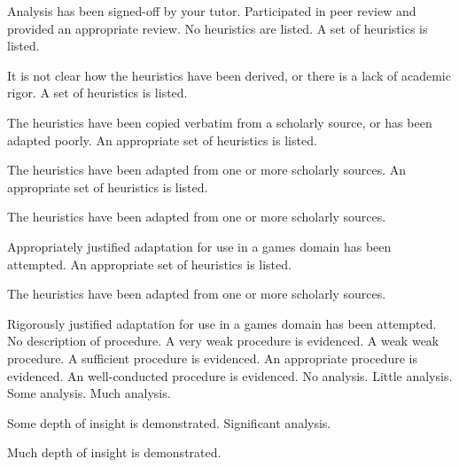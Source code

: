 \documentclass{../fal_assignment}
\begin{document}
\begin{markingrubric}
%
        \grade 		Analysis has been signed-off by your tutor.
%
        \grade 		Participated in peer review and provided an appropriate review.
%
        \grade\fail 	No heuristics are listed.
        \grade 		A set of heuristics is listed.
        \par 		It is not clear how the heuristics have been derived, or there is a lack of academic rigor.
        \grade 		A set of heuristics is listed.
        \par 		The heuristics have been copied verbatim from a scholarly source, or has been adapted poorly.
        \grade 		An appropriate set of heuristics is listed.
        \par 		The heuristics have been adapted from one or more scholarly sources.
        \grade 		An appropriate set of heuristics is listed.
        \par 		The heuristics have been adapted from one or more scholarly sources.
        \par 		Appropriately justified adaptation for use in a games domain has been attempted.        
        \grade 		An appropriate set of heuristics is listed.
        \par 		The heuristics have been adapted from one or more scholarly sources.
        \par 		Rigorously justified adaptation for use in a games domain has been attempted.    
%
        \grade\fail 	No description of procedure.
        \grade 		A very weak procedure is evidenced.
        \grade 		A weak weak procedure.
        \grade 		A sufficient procedure is evidenced.
        \grade 		An appropriate procedure is evidenced.
        \grade 		An well-conducted procedure is evidenced.
%
        \grade\fail 	No analysis.
        \grade 		Little analysis.
        \grade 		Some analysis.
        \grade 		Much analysis.
        \par 		Some depth of insight is demonstrated.
        \grade 		Significant analysis.
        \par 		Much depth of insight is demonstrated.

\end{markingrubric}
\end{document}
